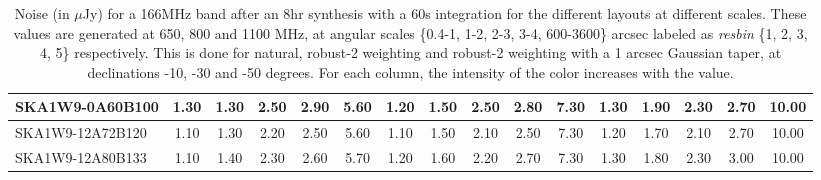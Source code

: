 \begin{table}[H]
{{\begin{tabular}{|lccccc||ccccc||ccccc|}
SKA1W9-0A60B100 & 1.30 \cellcolor{blue!39.00} & 1.30 \cellcolor{red!24.00} & 2.50 \cellcolor{green!60.00} & 2.90 \cellcolor{orange!60.00} & 5.60 \cellcolor{purple!39.00} & 1.20 \cellcolor{blue!28.50} & 1.50 \cellcolor{red!36.00} & 2.50 \cellcolor{green!60.00} & 2.80 \cellcolor{orange!60.00} & 7.30 \cellcolor{purple!49.50} & 1.30 \cellcolor{blue!39.00} & 1.90 \cellcolor{red!60.00} & 2.30 \cellcolor{green!60.00} & 2.70 \cellcolor{orange!44.25} & 10.00 \cellcolor{purple!18.00}\\ \hline 
SKA1W9-12A72B120 & 1.10 \cellcolor{blue!18.00} & 1.30 \cellcolor{red!24.00} & 2.20 \cellcolor{green!34.80} & 2.50 \cellcolor{orange!32.00} & 5.60 \cellcolor{purple!39.00} & 1.10 \cellcolor{blue!18.00} & 1.50 \cellcolor{red!36.00} & 2.10 \cellcolor{green!26.40} & 2.50 \cellcolor{orange!34.80} & 7.30 \cellcolor{purple!49.50} & 1.20 \cellcolor{blue!28.50} & 1.70 \cellcolor{red!43.20} & 2.10 \cellcolor{green!39.00} & 2.70 \cellcolor{orange!44.25} & 10.00 \cellcolor{purple!18.00}\\ \hline 
SKA1W9-12A80B133 & 1.10 \cellcolor{blue!18.00} & 1.40 \cellcolor{red!30.00} & 2.30 \cellcolor{green!43.20} & 2.60 \cellcolor{orange!39.00} & 5.70 \cellcolor{purple!60.00} & 1.20 \cellcolor{blue!28.50} & 1.60 \cellcolor{red!42.00} & 2.20 \cellcolor{green!34.80} & 2.70 \cellcolor{orange!51.60} & 7.30 \cellcolor{purple!49.50} & 1.30 \cellcolor{blue!39.00} & 1.80 \cellcolor{red!51.60} & 2.30 \cellcolor{green!60.00} & 3.00 \cellcolor{orange!60.00} & 10.00 \cellcolor{purple!18.00}\\ \hline 
\end{tabular}}
\vspace{-0.300000cm}
\hspace{1cm} 

\vspace{.25cm}
\caption{Noise (in $\mu$Jy) for a 166MHz band after an 8hr synthesis with a 60s integration for the different layouts at different scales. These values are generated at 650, 800 and 1100 MHz, at angular scales \{0.4-1, 1-2, 2-3, 3-4, 600-3600\} arcsec labeled as {\it resbin} \{1, 2, 3, 4, 5\} respectively. This is done for natural, robust-2 weighting and robust-2 weighting with a 1 arcsec Gaussian taper, at declinations -10, -30 and -50 degrees. For each column, the intensity of the color increases with the value.}\label{tab:noise166}}
 \end{table}
